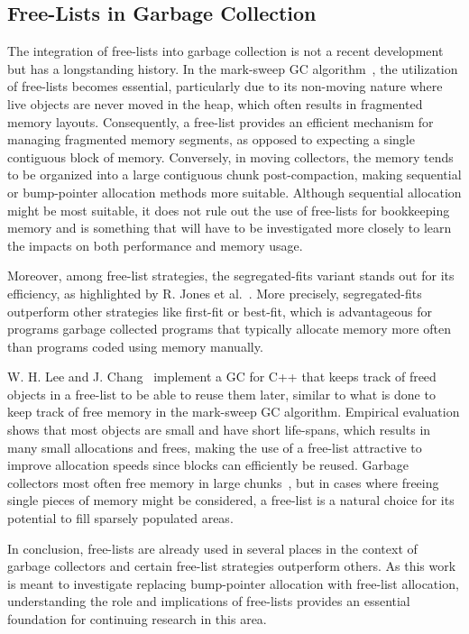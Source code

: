 \subsection{Free-Lists in Garbage Collection}

The integration of free-lists into garbage collection is not a recent development but has a longstanding history. In the mark-sweep GC algorithm~\cite{mark_sweep}, the utilization of free-lists becomes essential, particularly due to its non-moving nature where live objects are never moved in the heap, which often results in fragmented memory layouts. Consequently, a free-list provides an efficient mechanism for managing fragmented memory segments, as opposed to expecting a single contiguous block of memory. Conversely, in moving collectors, the memory tends to be organized into a large contiguous chunk post-compaction, making sequential or bump-pointer allocation methods more suitable. Although sequential allocation might be most suitable, it does not rule out the use of free-lists for bookkeeping memory and is something that will have to be investigated more closely to learn the impacts on both performance and memory usage.

Moreover, among free-list strategies, the segregated-fits variant stands out for its efficiency, as highlighted by R. Jones et al.~\cite[Section 7.8]{gchandbook}. More precisely, segregated-fits outperform other strategies like first-fit or best-fit, which is advantageous for programs garbage collected programs that typically allocate memory more often than programs coded using memory manually.

W. H. Lee and J. Chang~\cite{samsung_gc_free_list} implement a GC for C++ that keeps track of freed objects in a free-list to be able to reuse them later, similar to what is done to keep track of free memory in the mark-sweep GC algorithm. Empirical evaluation shows that most objects are small and have short life-spans, which results in many small allocations and frees, making the use of a free-list attractive to improve allocation speeds since blocks can efficiently be reused. Garbage collectors most often free memory in large chunks~\cite[Section 7.8]{gchandbook}, but in cases where freeing single pieces of memory might be considered, a free-list is a natural choice for its potential to fill sparsely populated areas.

In conclusion, free-lists are already used in several places in the context of garbage collectors and certain free-list strategies outperform others. As this work is meant to investigate replacing bump-pointer allocation with free-list allocation, understanding the role and implications of free-lists provides an essential foundation for continuing research in this area.

